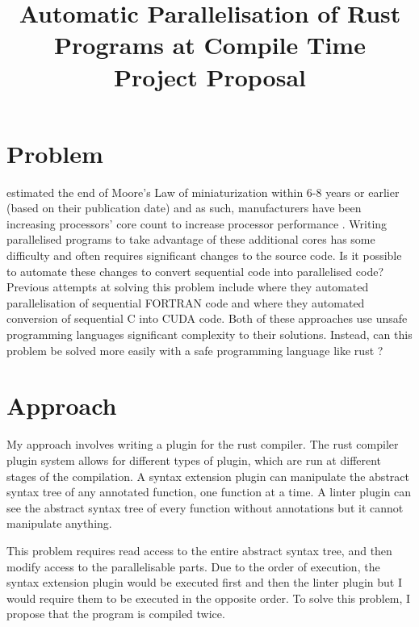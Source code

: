 \documentclass[12pt, a4paper]{article}
\title{
	\vspace{-4ex}
	\LARGE\textbf{Automatic Parallelisation of Rust Programs at Compile Time} \\
	\vspace{1ex}
	\large\textbf{Project Proposal}
	\vspace{-9ex}
}
\date{}
\begin{document}
\maketitle

\section{Problem}
\textcite{kish2002end} estimated the end of Moore's Law of miniaturization within 6-8 years or earlier (based on their publication date) and as such, manufacturers have been increasing processors' core count to increase processor performance \parencite{geer2005chip}. Writing parallelised programs to take advantage of these additional cores has some difficulty and often requires significant changes to the source code. Is it possible to automate these changes to convert sequential code into parallelised code? Previous attempts at solving this problem include \textcite{d1998fortran} where they automated parallelisation of sequential FORTRAN code and \textcite{baskaran2010automatic} where they automated conversion of sequential C into CUDA code. Both of these approaches use unsafe programming languages significant complexity  to their solutions. Instead, can this problem be solved more easily with a safe programming language like rust \parencite{rustlang}?

\section{Approach}
My approach involves writing a plugin for the rust compiler. The rust compiler plugin system allows for different types of plugin, which are run at different stages of the compilation. A syntax extension plugin can manipulate the abstract syntax tree of any annotated function, one function at a time. A linter plugin can see the abstract syntax tree of every function without annotations but it cannot manipulate anything.

This problem requires read access to the entire abstract syntax tree, and then modify access to the parallelisable parts. Due to the order of execution, the syntax extension plugin would be executed first and then the linter plugin but I would require them to be executed in the opposite order. To solve this problem, I propose that the program is compiled twice.
\end{document}
